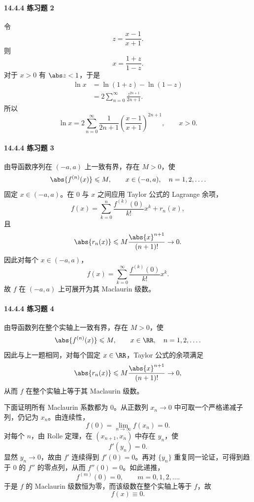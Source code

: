 \paragraph{14.4.4 练习题 2}
\begin{xsolution}
令
\[
  z=\frac{x-1}{x+1}.
\]
则
\[
  x=\frac{1+z}{1-z}.
\]
对于 $x>0$ 有 $\abs z<1$，于是
\[
\begin{aligned}
  \ln x
  &=\ln(1+z)-\ln(1-z)\\
  &=2\sum_{n=0}^{\infty}\frac{z^{2n+1}}{2n+1}.
\end{aligned}
\]
所以
\[
  \boxed{
  \ln x=2\sum_{n=0}^{\infty}\frac1{2n+1}
  \left(\frac{x-1}{x+1}\right)^{2n+1}},
  \qquad x>0.
\]
\end{xsolution}

\paragraph{14.4.4 练习题 3}
\begin{xsolution}
由导函数序列在 $(-a,a)$ 上一致有界，存在 $M>0$，使
\[
  \abs{f^{(n)}(x)}\leqslant M,
  \qquad x\in(-a,a),\quad n=1,2,\ldots.
\]
固定 $x\in(-a,a)$。在 $0$ 与 $x$ 之间应用 Taylor 公式的 Lagrange 余项，
\[
  f(x)=\sum_{k=0}^{n}\frac{f^{(k)}(0)}{k!}x^k+r_n(x),
\]
且
\[
  \abs{r_n(x)}
  \leqslant M\frac{\abs{x}^{n+1}}{(n+1)!}\to0.
\]
因此对每个 $x\in(-a,a)$，
\[
  f(x)=\sum_{k=0}^{\infty}\frac{f^{(k)}(0)}{k!}x^k.
\]
故 $f$ 在 $(-a,a)$ 上可展开为其 Maclaurin 级数。
\end{xsolution}

\paragraph{14.4.4 练习题 4}
\begin{xsolution}
由导函数列在整个实轴上一致有界，存在 $M>0$，使
\[
  \abs{f^{(n)}(x)}\leqslant M,
  \qquad x\in\RR,\quad n=1,2,\ldots.
\]
因此与上一题相同，对每个固定 $x\in\RR$，Taylor 公式的余项满足
\[
  \abs{r_n(x)}
  \leqslant M\frac{\abs{x}^{n+1}}{(n+1)!}\to0,
\]
从而 $f$ 在整个实轴上等于其 Maclaurin 级数。

下面证明所有 Maclaurin 系数都为 $0$。从正数列 $x_n\to0$ 中可取一个严格递减子列，仍记为 $x_n$。由连续性，
\[
  f(0)=\lim_{n\to\infty}f(x_n)=0.
\]
对每个 $n$，由 Rolle 定理，在 $(x_{n+1},x_n)$ 中存在 $y_n$，使
\[
  f'(y_n)=0.
\]
显然 $y_n\to0$，故由 $f'$ 连续得到 $f'(0)=0$。再对 $\{y_n\}$ 重复同一论证，可得到趋于 $0$ 的 $f''$ 的零点列，从而 $f''(0)=0$。如此递推，
\[
  f^{(m)}(0)=0,\qquad m=0,1,2,\ldots.
\]
于是 $f$ 的 Maclaurin 级数恒为零，而该级数在整个实轴上等于 $f$，故
\[
  \boxed{f(x)\equiv0}.
\]
\end{xsolution}

